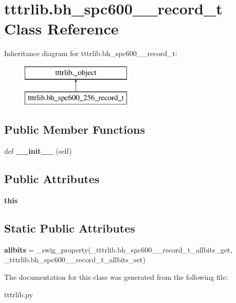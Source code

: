 \hypertarget{classtttrlib_1_1bh__spc600__256__record__t}{}\section{tttrlib.\+bh\+\_\+spc600\+\_\+\_\+record\+\_\+t Class Reference}
\label{classtttrlib_1_1bh__spc600__256__record__t}
Inheritance diagram for tttrlib.\+bh\+\_\+spc600\+\_\+\_\+record\+\_\+t\+:\begin{figure}[H]
\begin{center}
\leavevmode
\includegraphics[height=2.000000cm]{classtttrlib_1_1bh__spc600__256__record__t}
\end{center}
\end{figure}
\subsection*{Public Member Functions}
\begin{DoxyCompactItemize}
\item 
\mbox{\label{classtttrlib_1_1bh__spc600__256__record__t_a39c2436a7480b4ad4f3051dab8fd0c90}} 
def {\bfseries \+\_\+\+\_\+init\+\_\+\+\_\+} (self)
\end{DoxyCompactItemize}
\subsection*{Public Attributes}
\begin{DoxyCompactItemize}
\item 
\mbox{\label{classtttrlib_1_1bh__spc600__256__record__t_a0a6c73ed9bd69d787e5be8786a450e41}} 
{\bfseries this}
\end{DoxyCompactItemize}
\subsection*{Static Public Attributes}
\begin{DoxyCompactItemize}
\item 
\mbox{\label{classtttrlib_1_1bh__spc600__256__record__t_a66ceeafb006ed6bac2a6cc3861041d5b}} 
{\bfseries allbits} = \+\_\+swig\+\_\+property(\+\_\+tttrlib.\+bh\+\_\+spc600\+\_\+\_\+record\+\_\+t\+\_\+allbits\+\_\+get, \+\_\+tttrlib.\+bh\+\_\+spc600\+\_\+\_\+record\+\_\+t\+\_\+allbits\+\_\+set)
\end{DoxyCompactItemize}


The documentation for this class was generated from the following file\+:\begin{DoxyCompactItemize}
\item 
tttrlib.\+py\end{DoxyCompactItemize}
